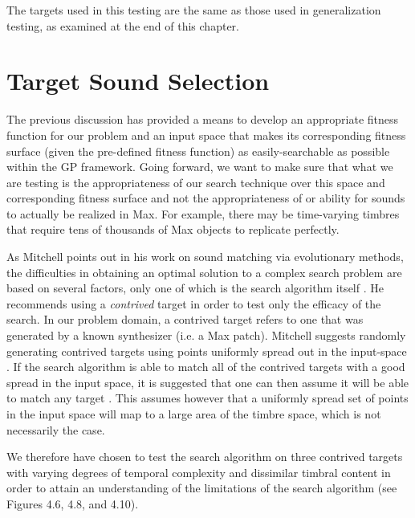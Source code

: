\documentclass[12pt]{report} 	%
\numberwithin{figure}{chapter}
\numberwithin{table}{chapter}
\numberwithin{equation}{chapter}
\begin{document}
\begin{flushleft}
The targets used in this testing are the same as those used in generalization testing, as examined at the end of this chapter.

\section{Target Sound Selection}

The previous discussion has provided a means to develop an appropriate fitness function for our problem and an input space that makes its corresponding fitness surface (given the pre-defined fitness function) as easily-searchable as possible within the GP framework. Going forward, we want to make sure that what we are testing is the appropriateness of our search technique over this space and corresponding fitness surface and not the appropriateness of or ability for sounds to actually be realized in Max. For example, there may be time-varying timbres that require tens of thousands of Max objects to replicate perfectly.

As Mitchell points out in his work on sound matching via evolutionary methods, the difficulties in obtaining an optimal solution to a complex search problem are based on several factors, only one of which is the search algorithm itself \cite[p. 1]{Mitchell:2007fe}. He recommends using a \textit{contrived} target in order to test only the efficacy of the search. In our problem domain, a contrived target refers to one that was generated by a known synthesizer (i.e. a Max patch). Mitchell suggests randomly generating contrived targets using points uniformly spread out in the input-space \cite[p. 2]{Mitchell:2007fe}. If the search algorithm is able to match all of the contrived targets with a good spread in the input space, it is suggested that one can then assume it will be able to match any target \cite[p. 2]{Mitchell:2007fe}. This assumes however that a uniformly spread set of points in the input space will map to a large area of the timbre space, which is not necessarily the case.

We therefore have chosen to test the search algorithm on three contrived targets with varying degrees of temporal complexity and dissimilar timbral content in order to attain an understanding of the limitations of the search algorithm (see Figures 4.6, 4.8, and 4.10). 


\end{flushleft}
\end{document}
